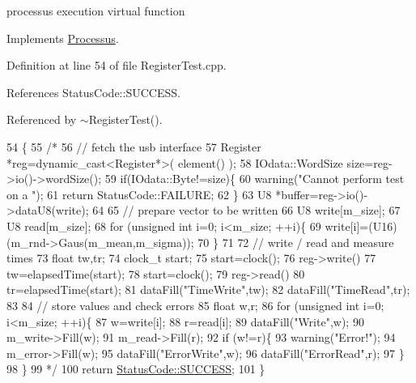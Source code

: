processus execution virtual function 

Implements \hyperlink{classProcessus_a63767a63a1fb0055c5aa45b21a4a5d58}{Processus}.



Definition at line 54 of file Register\+Test.\+cpp.



References Status\+Code\+::\+S\+U\+C\+C\+E\+SS.



Referenced by $\sim$\+Register\+Test().


\begin{DoxyCode}
54                                    \{
55   \textcolor{comment}{/*}
56 \textcolor{comment}{  // fetch the usb interface
}
57 \textcolor{comment}{  Register *reg=dynamic\_cast<Register*>( element() );
}
58 \textcolor{comment}{  IOdata::WordSize size=reg->io()->wordSize();
}
59 \textcolor{comment}{  if(IOdata::Byte!=size)\{
}
60 \textcolor{comment}{    warning("Cannot perform test on a ");
}
61 \textcolor{comment}{    return StatusCode::FAILURE;
}
62 \textcolor{comment}{  \}
}
63 \textcolor{comment}{  U8 *buffer=reg->io()->dataU8(write);
}
64 \textcolor{comment}{}
65 \textcolor{comment}{  // prepare vector to be written
}
66 \textcolor{comment}{  U8 write[m\_size];
}
67 \textcolor{comment}{  U8 read[m\_size];
}
68 \textcolor{comment}{  for (unsigned int i=0; i<m\_size; ++i)\{
}
69 \textcolor{comment}{    write[i]=(U16)(m\_rnd->Gaus(m\_mean,m\_sigma));
}
70 \textcolor{comment}{  \}
}
71 \textcolor{comment}{}
72 \textcolor{comment}{  // write / read and measure times
}
73 \textcolor{comment}{  float tw,tr;
}
74 \textcolor{comment}{  clock\_t start;
}
75 \textcolor{comment}{  start=clock();
}
76 \textcolor{comment}{  reg->write()
}
77 \textcolor{comment}{  tw=elapsedTime(start);
}
78 \textcolor{comment}{  start=clock();
}
79 \textcolor{comment}{  reg->read()
}
80 \textcolor{comment}{  tr=elapsedTime(start);
}
81 \textcolor{comment}{  dataFill("TimeWrite",tw);
}
82 \textcolor{comment}{  dataFill("TimeRead",tr);
}
83 \textcolor{comment}{}
84 \textcolor{comment}{  // store values and check errors
}
85 \textcolor{comment}{  float w,r;
}
86 \textcolor{comment}{  for (unsigned int i=0; i<m\_size; ++i)\{
}
87 \textcolor{comment}{    w=write[i];
}
88 \textcolor{comment}{    r=read[i];
}
89 \textcolor{comment}{    dataFill("Write",w);
}
90 \textcolor{comment}{    m\_write->Fill(w);
}
91 \textcolor{comment}{    m\_read->Fill(r);
}
92 \textcolor{comment}{    if (w!=r)\{
}
93 \textcolor{comment}{      warning("Error!");
}
94 \textcolor{comment}{      m\_error->Fill(w);
}
95 \textcolor{comment}{      dataFill("ErrorWrite",w);
}
96 \textcolor{comment}{      dataFill("ErrorRead",r);
}
97 \textcolor{comment}{    \}
}
98 \textcolor{comment}{  \}
}
99 \textcolor{comment}{  */}
100   \textcolor{keywordflow}{return} \hyperlink{classStatusCode_a6f565cbeadc76d14c72f047e5e85eb4badd0da38d3ba0d922efd1f4619bc37ad8}{StatusCode::SUCCESS};
101 \}
\end{DoxyCode}
\mbox{\label{classRegisterTest_a6d37b30d3e663c99f7deef01310bea76}} 

